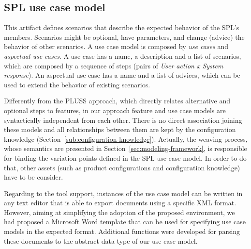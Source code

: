 
\subsection{SPL use case model}\label{sub:spl-uc}

This artifact defines scenarios that describe the expected behavior of the SPL's
members. Scenarios might be optional, have parameters, and change (advice) the
behavior of other scenarios. A use case model is composed by \emph{use cases} and
\emph{aspectual use cases}. A use case has a name, a description and a list of
scenarios, which are composed by a sequence of steps (pairs of \emph{User action x
System response}). An aspectual use case has a name and a list of advices, which
can be used to extend the behavior of existing scenarios.

Differently from the PLUSS approach, which directly relates alternative and
optional steps to features, in our approach {\color{red}feature and use case
models are syntactically independent from each other. There is no direct
association joining these models and all relationships between them are kept by
the configuration knowledge (Section~\ref{sub:configuration-knowledge}).}
 {\color{red} Actually, the weaving process, whose semantics are presented in
 Section~\ref{sec:modeling-framework}, is responsible for binding the variation
 points defined in the SPL use case model. In order to do that, other assets
 (such as product configurations and configuration knowledge) have to be
 consider.}

{\color{red} Regarding to the tool support, instances of the use case model can
be written in any text editor that is able to export documents using a specific
XML format. However, aiming at simplifying the adoption of the proposed
environment, we had proposed a Microsoft Word template that can be used for
specifying use case models in the expected format. Additional functions were
developed for parsing these documents to the abstract data type of our use case
model.}

